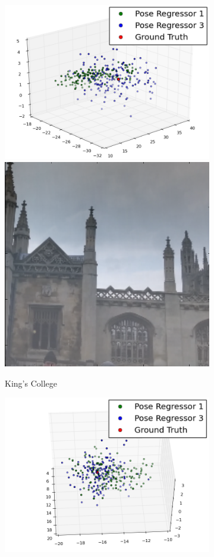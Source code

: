 \begin{figure}[t]
\begin{center}
	\begin{subfigure}{0.25\linewidth}
		\begin{center}
        \includegraphics[width=\linewidth]{Uncertainty/pose_samples_kings1}
        \includegraphics[width=0.5\linewidth]{Uncertainty/pose_samples_kigns1_img}
		\end{center}
        \caption{King's College}
    \end{subfigure}
    	\begin{subfigure}{0.25\linewidth}
		\begin{center}
        \includegraphics[width=\linewidth]{Uncertainty/pose_samples_stmarys1}

\end{center}
\end{subfigure}
\end{center}
\end{figure}
